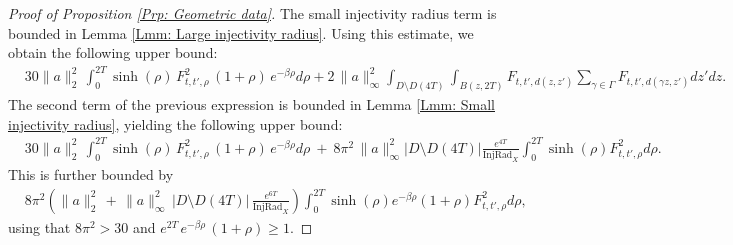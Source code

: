 \documentclass[10pt,a4paper]{amsart}
\begin{document}
\begin{proof}[Proof of Proposition \ref{Prp: Geometric data}]
The small injectivity radius term is bounded in Lemma \ref{Lmm: Large injectivity radius}. Using this estimate, we obtain the following upper bound:
\begin{align*}
	&
	30 \| a \|_{2}^{2} \, \int_{0}^{2T}  \sinh( \rho ) \, F_{t,t',\rho}^{2} \, ( 1 + \rho ) \, e^{ -\beta \rho } d \rho 
	+ 2 \, \| a \|_{\infty}^{2} \int_{D \setminus D( 4T )} \int_{ B( z, 2T ) }   F_{t,t', d( z,z' )}  \sum_{\gamma \in \Gamma}^{} F_{t,t', d( \gamma z, z' )} dz' dz.
\end{align*}
The second term of the previous expression is bounded in Lemma \ref{Lmm: Small injectivity radius}, yielding the following upper bound:
\begin{align*}
	&
	30 \| a \|_{2}^{2} \, \int_{0}^{2T}  \sinh( \rho ) \, F_{t,t',\rho}^{2} \, ( 1 + \rho ) \, e^{ -\beta  \rho } d \rho 
	\ + \ 8\pi^{2}  \, \| a \|_{\infty}^{2} | D \setminus D( 4T ) | \frac{e^{4T}}{\operatorname{InjRad}_{X}} \int_{0}^{2T} \sinh( \rho ) F_{t,t',\rho}^{2} d\rho.
\end{align*}
This is further bounded by
\begin{align*}
	&
	8 \pi^{2}\left( \| a \|_{2}^{2} \, + \, \| a \|_{\infty}^{2} \, | D \setminus D( 4T ) | \, \frac{ e^{ 6T }}{ \operatorname{InjRad}_{X} } \right) \int_{0}^{2T} \sinh( \rho ) e^{ -\beta \rho} ( 1 + \rho ) F_{t,t',\rho}^{2} d \rho,
\end{align*}
using that $ 8 \pi^{2} > 30 $ and $ e^{ 2T } \, e^{ -\beta \rho } \, ( 1 + \rho ) \geq 1 $.


\end{proof}
\end{document}
